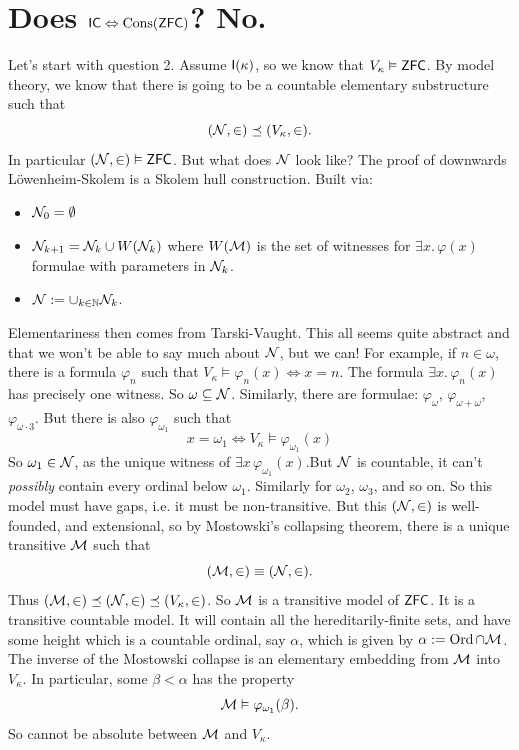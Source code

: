 \documentclass{article}
\begin{document}
\section{Does $\mathsf{IC} \Leftrightarrow \operatorname{Cons}(\mathsf{ZFC})$? No.}
Let's start with question 2. Assume $\mathsf{I}(\kappa)$, so we know that $V_{\kappa} \vDash \mathsf{ZFC}$. By model theory, we know that there is going to be a countable elementary substructure such that \[(\mathcal{N}, \in) \preceq (V_{\kappa}, \in).\] In particular $(\mathcal{N}, \in) \vDash \mathsf{ZFC}$. But what does $\mathcal{N}$ look like? The proof of downwards L\"owenheim-Skolem is a Skolem hull construction. Built via: \begin{itemize}
    \item $\mathcal{N}_{0} = \emptyset$
    \item $\mathcal{N}_{k+1} = \mathcal{N}_{k} \cup W(\mathcal{N}_{k})$ where $W(\mathcal{M})$ is the set of witnesses for $\exists x. \, \varphi(x)$ formulae with parameters in $\mathcal{N}_{k}$.
    \item $\mathcal{N} := \cup_{k \in \mathbb{N}} \mathcal{N}_{k}$.
\end{itemize}
Elementariness then comes from Tarski-Vaught.\gap 
This all seems quite abstract and that we won't be able to say much about $\mathcal{N}$, but we can! For example, if $n \in \omega$, there is a formula $\varphi_{n}$ such that $V_{\kappa} \models \varphi_{n}(x) \Leftrightarrow x=n$. The formula $\exists x. \, \varphi_{n}(x)$ has precisely one witness. So $\omega \subseteq \mathcal{N}$. Similarly, there are formulae: $\varphi_{\omega}$, $\varphi_{\omega + \omega}$, $\varphi_{\omega \cdot 3}$. \gap 
But there is also $\varphi_{\omega_{1}}$ such that \[ x = \omega_{1} \Leftrightarrow V_{\kappa} \models \varphi_{\omega_{1}}(x)\] So $\omega_{1} \in \mathcal{N}$, as the unique witness of $\exists x \, \varphi_{\omega_{1}}(x)$.\gap But $\mathcal{N}$ is countable, it can't \textit{possibly} contain every ordinal below $\omega_{1}$. Similarly for $\omega_{2}$, $\omega_{3}$, and so on. So this model must have gaps, i.e. it must be non-transitive. \gap 
But this $(\mathcal{N}, \in)$ is well-founded, and extensional, so by Mostowski's collapsing theorem, there is a unique transitive $\mathcal{M}$ such that \[ (\mathcal{M}, \in) \equiv (\mathcal{N}, \in).\]
Thus $(\mathcal{M}, \in) \preceq (\mathcal{N}, \in) \preceq (V_{\kappa}, \in)$. So $\mathcal{M}$ is a transitive model of $\mathsf{ZFC}$. It is a transitive countable model. It will contain all the hereditarily-finite sets, and have some height which is a countable ordinal, say $\alpha$, which is given by $\alpha := \operatorname{Ord} \cap \mathcal{M}$. The inverse of the Mostowski collapse is an elementary embedding from $\mathcal{M}$ into $V_{\kappa}$. In particular, some $\beta < \alpha$ has the property \[ \mathcal{M} \vDash \varphi_{\omega_{1}}(\beta).\]
So  cannot be absolute between $\mathcal{M}$ and $V_{\kappa}$.
\end{document}
